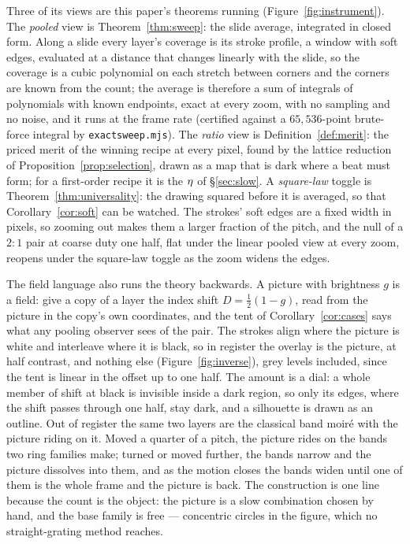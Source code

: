 Three of its views are this paper's theorems running
(Figure~\ref{fig:instrument}). The \emph{pooled} view is
Theorem~\ref{thm:sweep}: the slide average, integrated in closed form.
Along a slide every layer's coverage is its stroke profile, a window with
soft edges, evaluated at a distance that changes linearly with the slide,
so the coverage is a cubic polynomial on each stretch between corners and
the corners are known from the count; the average is therefore a sum of
integrals of polynomials with known endpoints, exact at every zoom, with no
sampling and no noise, and it runs at the frame rate (certified against a
$65{,}536$-point brute-force integral by \texttt{exactsweep.mjs}). The
\emph{ratio} view is Definition~\ref{def:merit}: the priced merit of the
winning recipe at every pixel, found by the lattice reduction of
Proposition~\ref{prop:selection}, drawn as a map that is dark where a beat
must form; for a first-order recipe it is the $\eta$ of
\S\ref{sec:slow}. A \emph{square-law} toggle is
Theorem~\ref{thm:universality}: the drawing squared before it is averaged,
so that Corollary~\ref{cor:soft} can be watched. The strokes' soft edges
are a fixed width in pixels, so zooming out makes them a larger fraction
of the pitch, and the null of a $2{:}1$ pair at coarse duty one half, flat
under the linear pooled view at every zoom, reopens under the square-law
toggle as the zoom widens the edges.

The field language also runs the theory backwards. A picture with
brightness $g$ is a field: give a copy of a layer the index shift
$D=\tfrac12(1-g)$, read from the picture in the copy's own coordinates,
and the tent of Corollary~\ref{cor:cases} says what any pooling observer
sees of the pair. The strokes align where the picture is white and
interleave where it is black, so in register the overlay is the picture,
at half contrast, and nothing else (Figure~\ref{fig:inverse}), grey
levels included, since the tent is linear in the offset up to one half.
The amount is a dial: a whole member of shift at black is invisible inside
a dark region, so only its edges, where the shift passes through one half,
stay dark, and a silhouette is drawn as an outline. Out of register the
same two layers are the classical band moir\'e with the picture riding on
it. Moved a quarter of a pitch, the picture rides on the bands two ring
families make; turned or moved further, the bands narrow and the picture
dissolves into them, and as the motion closes the bands widen until one of
them is the whole frame and the picture is back. The construction is one
line because the count is the object: the picture is a slow combination
chosen by hand, and the base family is free --- concentric circles in the
figure, which no straight-grating method reaches.

